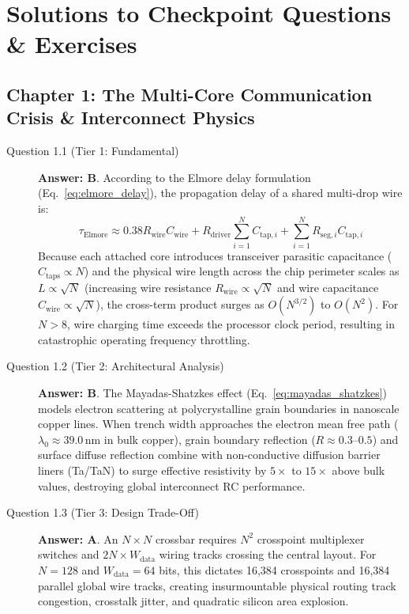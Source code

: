 
\chapter*{Solutions to Checkpoint Questions \& Exercises}
\label{ch:solutions}

\section*{Chapter 1: The Multi-Core Communication Crisis \& Interconnect Physics}

\begin{description}
    \item[Question 1.1 (Tier 1: Fundamental)] \textbf{Answer: B}.
    According to the Elmore delay formulation (Eq.~\ref{eq:elmore_delay}), the propagation delay of a shared multi-drop wire is:
    \begin{equation*}
    \tau_{\mathrm{Elmore}} \approx 0.38 R_{\mathrm{wire}} C_{\mathrm{wire}} + R_{\mathrm{driver}} \sum_{i=1}^N C_{\mathrm{tap}, i} + \sum_{i=1}^N R_{\mathrm{seg}, i} C_{\mathrm{tap}, i}
    \end{equation*}
    Because each attached core introduces transceiver parasitic capacitance ($C_{\mathrm{taps}} \propto N$) and the physical wire length across the chip perimeter scales as $L \propto \sqrt{N}$ (increasing wire resistance $R_{\mathrm{wire}} \propto \sqrt{N}$ and wire capacitance $C_{\mathrm{wire}} \propto \sqrt{N}$), the cross-term product surges as $O(N^{3/2})$ to $O(N^2)$. For $N > 8$, wire charging time exceeds the processor clock period, resulting in catastrophic operating frequency throttling.

    \item[Question 1.2 (Tier 2: Architectural Analysis)] \textbf{Answer: B}.
    The Mayadas-Shatzkes effect (Eq.~\ref{eq:mayadas_shatzkes}) models electron scattering at polycrystalline grain boundaries in nanoscale copper lines. When trench width approaches the electron mean free path ($\lambda_0 \approx 39.0\,\mathrm{nm}$ in bulk copper), grain boundary reflection ($R \approx 0.3$--$0.5$) and surface diffuse reflection combine with non-conductive diffusion barrier liners (Ta/TaN) to surge effective resistivity by $5\times$ to $15\times$ above bulk values, destroying global interconnect RC performance.

    \item[Question 1.3 (Tier 3: Design Trade-Off)] \textbf{Answer: A}.
    An $N \times N$ crossbar requires $N^2$ crosspoint multiplexer switches and $2N \times W_{\mathrm{data}}$ wiring tracks crossing the central layout. For $N = 128$ and $W_{\mathrm{data}} = 64$ bits, this dictates 16,384 crosspoints and 16,384 parallel global wire tracks, creating insurmountable physical routing track congestion, crosstalk jitter, and quadratic silicon area explosion.
\end{description}

